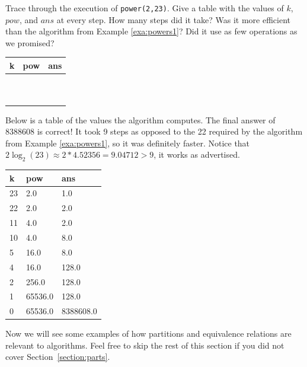 \begin{exer}
Trace through the execution of \verb+power(2,23)+. Give a table
with the values of $k$, $pow$, and $ans$ at every step.
How many steps did it take? Was it more efficient than
the algorithm from Example \ref{exa:powers1}? Did it use
as few operations as we promised?

\noindent
{\LARGE
\begin{tabular}{|p{.5in}|p{1.5in}|p{1.5in}|}
\hline
k&pow&ans\\
\hline
&&\\
\hline
&&\\
\hline
&&\\
\hline
&&\\
\hline
&&\\
\hline
&&\\
\hline
&&\\
\hline
&&\\
\hline
&&\\
\hline
&&\\
\hline
\end{tabular}
}
\begin{answer}
Below is a table of the values the algorithm computes.
The final answer of 8388608 is correct!
It took 9 steps as opposed to the 22 required by the 
algorithm from Example \ref{exa:powers1}, so it was
definitely faster. Notice that 
$2 \log_2(23) \approx 2*4.52356=9.04712>9$, 
it works as advertised.

\begin{tabular}{|l|l|l|}
\hline
k&pow&ans\\
\hline
23&2.0&1.0\\
22&2.0&2.0\\
11&4.0&2.0\\
10&4.0&8.0\\
5&16.0&8.0\\
4&16.0&128.0\\
2&256.0&128.0\\
1&65536.0&128.0\\
0&65536.0&8388608.0\\
\hline
\end{tabular}
\end{answer}
\end{exer}




Now we will see some examples of how
partitions and equivalence relations are relevant to algorithms.
Feel free to skip the rest of this section if you did not
cover Section~\ref{section:parts}.

